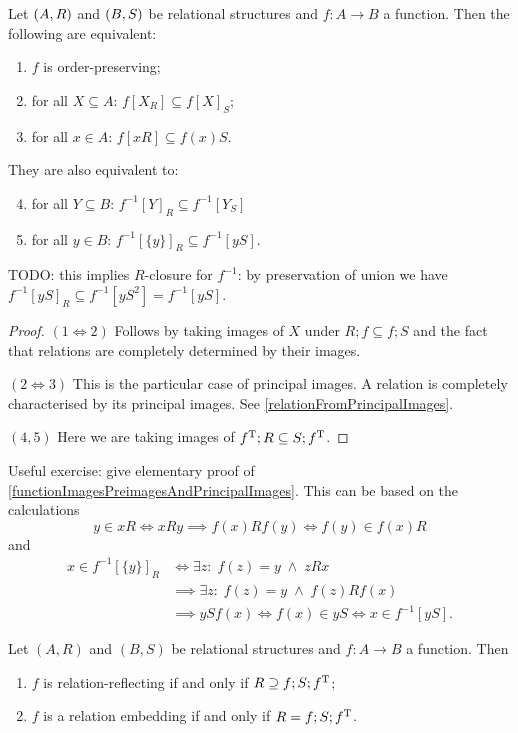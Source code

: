 \begin{corollary} \label{functionImagesPreimagesAndPrincipalImages}
Let $\left( A,R \right)$ and $\left( B, S \right)$ be relational structures and $f: A\to B$ a function. Then the following are equivalent:
\begin{enumerate}
\item $f$ is order-preserving;
\item for all $X\subseteq A$: $f[X_R] \subseteq f[X]_S$;
\item for all $x\in A$: $f[xR] \subseteq f(x)S$.
\end{enumerate}
They are also equivalent to:
\begin{enumerate} \setcounter{enumi}{3}
\item for all $Y\subseteq B$: $f^{-1}[Y]_R \subseteq f^{-1}[Y_S]$
\item for all $y\in B$: $f^{-1}[\{y\}]_R \subseteq f^{-1}[yS]$.
\end{enumerate}
\end{corollary}
TODO: this implies $R$-closure for $f^{-1}$: by preservation of union we have $f^{-1}[yS]_R \subseteq f^{-1}[yS^2] = f^{-1}[yS]$.
\begin{proof}
$(1 \Leftrightarrow 2)$ Follows by taking images of $X$ under $R;f \subseteq f;S$ and the fact that relations are completely determined by their images.

$(2 \Leftrightarrow 3)$ This is the particular case of principal images. A relation is completely characterised by its principal images. See \ref{relationFromPrincipalImages}.

$(4, 5)$ Here we are taking images of $f^{\mathrm{T}};R \subseteq S;f^{\mathrm{T}}$.
\end{proof}
\begin{note}
Useful exercise: give elementary proof of \ref{functionImagesPreimagesAndPrincipalImages}. This can be based on the calculations
\[ y\in xR \iff xRy \implies f(x)Rf(y) \iff f(y) \in f(x)R \]
and
\begin{align*}
x\in f^{-1}[\{y\}]_R &\iff \exists z:\; f(z) = y \;\land\; zRx \\
&\implies \exists z:\; f(z) = y \;\land\; f(z)Rf(x) \\
&\implies ySf(x) \iff f(x) \in yS \iff x\in f^{-1}[yS].
\end{align*}
\end{note}

\begin{lemma}
Let $(A, R)$ and $(B, S)$ be relational structures and $f: A\to B$ a function. Then
\begin{enumerate}
\item $f$ is relation-reflecting \textup{if and only if} $R \supseteq f;S;f^{\mathrm{T}}$;
\item $f$ is a relation embedding \textup{if and only if} $R = f;S;f^{\mathrm{T}}$.
\end{enumerate}
\end{lemma}

